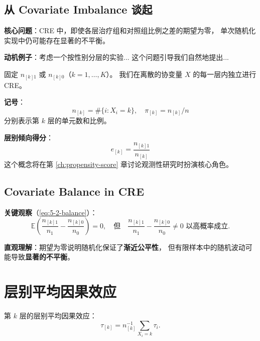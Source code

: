 \subsection{从 Covariate Imbalance 谈起}

\textbf{核心问题}：CRE 中，即使各层治疗组和对照组比例之差的期望为零，
单次随机化实现中仍可能存在显著的不平衡。

\textbf{动机例子}：考虑一个按性别分层的实验...
这个问题引导我们自然地提出...

\begin{Definition}\label{def:5-1}
固定 $n_{[k]1}$ 或 $n_{[k]0}$（$k = 1, \dots, K$）。
我们在离散的协变量 $X$ 的每一层内独立进行 CRE。
\end{Definition}

\textbf{记号}：
\[
n_{[k]} = \#\{i: X_i = k\}, \quad \pi_{[k]} = n_{[k]} / n
\]
分别表示第 $k$ 层的单元数和比例。

\textbf{层别倾向得分}：
\[
e_{[k]} = \frac{n_{[k]1}}{n_{[k]}}
\]
这个概念将在第 \ref{ch:propensity-score} 章讨论观测性研究时扮演核心角色。

\subsection{Covariate Balance in CRE}

\textbf{关键观察}（\cref{eq:5-2-balance}）：
\begin{equation}
\mathbb{E}\left( \frac{n_{[k]1}}{n_1} - \frac{n_{[k]0}}{n_0} \right) = 0,
\quad \text{但} \quad
\frac{n_{[k]1}}{n_1} - \frac{n_{[k]0}}{n_0} \neq 0 \text{ 以高概率成立}.
\label{eq:5-2-balance}
\end{equation}

\textbf{直观理解}：期望为零说明随机化保证了\textbf{渐近公平性}，
但有限样本中的随机波动可能导致\textbf{显著的不平衡}。

\par{}

\section{层别平均因果效应}\label{sec:5-stratified-ace}

第 $k$ 层的层别平均因果效应：
\[
\tau_{[k]} = n_{[k]}^{-1} \sum_{X_i = k} \tau_i.
\]

